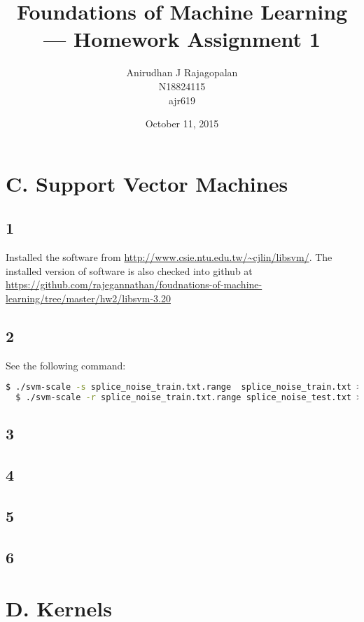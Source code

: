 \documentclass{article}
\begin{document}
\title{Foundations of Machine Learning --- Homework Assignment 1}
\date{October 11, 2015}
\author{Anirudhan J Rajagopalan\\ N18824115\\ ajr619}

\maketitle

\newpage

\section*{C. Support Vector Machines}
\subsection*{1}
Installed the software from \url{http://www.csie.ntu.edu.tw/~cjlin/libsvm/}.  The installed version of software is also checked into github at \url{https://github.com/rajegannathan/foudnations-of-machine-learning/tree/master/hw2/libsvm-3.20}
\subsection*{2}

\noindent See the following command:
\begin{lstlisting}[language=bash]
  $ ./svm-scale -s splice_noise_train.txt.range  splice_noise_train.txt > splice_noise_train.txt.scale
  $ ./svm-scale -r splice_noise_train.txt.range splice_noise_test.txt > splice_noise_test.txt.scale
\end{lstlisting}

\subsection*{3}
\subsection*{4}
\subsection*{5}
\subsection*{6}

\section*{D. Kernels}
\end{document}
